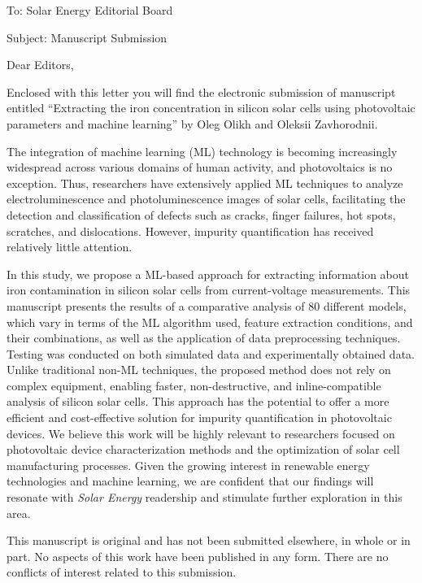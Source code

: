 \documentclass[preprint]{elsarticle}
\begin{document}
To:
Solar Energy Editorial Board


Subject:
Manuscript Submission

\vspace{5mm}
Dear Editors,

\vspace{3mm}

Enclosed with this letter you will find the electronic submission of manuscript entitled
``Extracting the iron concentration in silicon solar cells using photovoltaic parameters and machine learning'' by Oleg Olikh and Oleksii Zavhorodnii.

The integration of machine learning (ML) technology is becoming increasingly widespread across various domains of human activity, 
and photovoltaics is no exception. 
Thus, researchers have extensively applied ML techniques to analyze electroluminescence and photoluminescence images of solar cells, 
facilitating the detection and classification of defects such as cracks, finger failures, hot spots, scratches, and dislocations. 
However, impurity quantification has received relatively little attention.

In this study, we propose a ML-based approach for extracting information about iron contamination in silicon solar cells from current-voltage measurements. 
This manuscript presents the results of a comparative analysis of 80 different models, 
which vary in terms of the ML algorithm used, feature extraction conditions, and their combinations, as well as the application of data preprocessing techniques. 
Testing was conducted on both simulated data and experimentally obtained data.
Unlike traditional non-ML techniques, the proposed method does not rely on complex equipment, 
enabling faster, non-destructive, and inline-compatible analysis of silicon solar cells. 
This approach has the potential to offer a more efficient and cost-effective solution for impurity quantification in photovoltaic devices.
We believe this work will be highly relevant to researchers focused on photovoltaic device characterization methods and the optimization of solar cell manufacturing processes.
Given the growing interest in renewable energy technologies and machine learning,
we are confident that our findings will resonate with \emph{Solar Energy} readership and stimulate further exploration in this area.


This manuscript is original and has not been submitted elsewhere, in whole or in part.
No aspects of this work have been published in any form.
There are no conflicts of interest related to this submission.
\end{document}
